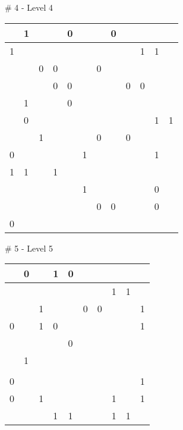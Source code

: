 \medskip

\# 4 - Level 4 \newline
\begin{tabular}{|m{\collen}|m{\collen}|m{\collen}|m{\collen}|m{\collen}|m{\collen}|m{\collen}|m{\collen}|m{\collen}|m{\collen}|m{\collen}|m{\collen}|}
\hline
    & 1 &   &   & 0 &   &   & 0 &   &   &   &   \\
\hline
  1 &   &   &   &   &   &   &   &   & 1 & 1 &   \\
\hline
    &   & 0 & 0 &   &   & 0 &   &   &   &   &   \\
\hline
    &   &   & 0 & 0 &   &   &   & 0 & 0 &   &   \\
\hline
    & 1 &   &   & 0 &   &   &   &   &   &   &   \\
\hline
    & 0 &   &   &   &   &   &   &   &   & 1 & 1 \\
\hline
    &   & 1 &   &   &   & 0 &   & 0 &   &   &   \\
\hline
  0 &   &   &   &   & 1 &   &   &   &   & 1 &   \\
\hline
  1 & 1 &   & 1 &   &   &   &   &   &   &   &   \\
\hline
    &   &   &   &   & 1 &   &   &   &   & 0 &   \\
\hline
    &   &   &   &   &   & 0 & 0 &   &   & 0 &   \\
\hline
  0 &   &   &   &   &   &   &   &   &   &   &   \\
\hline
\end{tabular}


\medskip

\# 5 - Level 5 \newline
\begin{tabular}{|m{\collen}|m{\collen}|m{\collen}|m{\collen}|m{\collen}|m{\collen}|m{\collen}|m{\collen}|m{\collen}|m{\collen}|}
\hline
    & 0 &   & 1 & 0 &   &   &   &   &   \\
\hline
    &   &   &   &   &   &   & 1 & 1 &   \\
\hline
    &   & 1 &   &   & 0 & 0 &   &   & 1 \\
\hline
  0 &   & 1 & 0 &   &   &   &   &   & 1 \\
\hline
    &   &   &   & 0 &   &   &   &   &   \\
\hline
    & 1 &   &   &   &   &   &   &   &   \\
\hline
    &   &   &   &   &   &   &   &   &   \\
\hline
  0 &   &   &   &   &   &   &   &   & 1 \\
\hline
  0 &   & 1 &   &   &   &   & 1 &   & 1 \\
\hline
    &   &   & 1 & 1 &   &   & 1 & 1 &   \\
\hline
\end{tabular}


